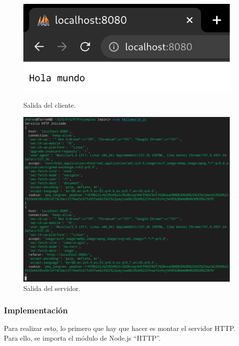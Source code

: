 \documentclass{article}
\begin{document}
\begin{figure}[H]
    \centering
    \begin{minipage}[H]{0.49\textwidth}
        \centering
        \includegraphics[width=\textwidth]{images/helloworldC.png}
        \caption{Salida del cliente.}
    \end{minipage}
    \hfill
    \begin{minipage}[H]{0.49\textwidth}
        \centering
        \includegraphics[width=\textwidth]{images/helloworldS.png}
        \caption{Salida del servidor.}
    \end{minipage}
\end{figure}

\subsubsection{Implementación}
Para realizar esto, lo primero que hay que hacer es montar el servidor HTTP. Para ello, se importa el módulo de Node.js ``HTTP''.
\end{document}
